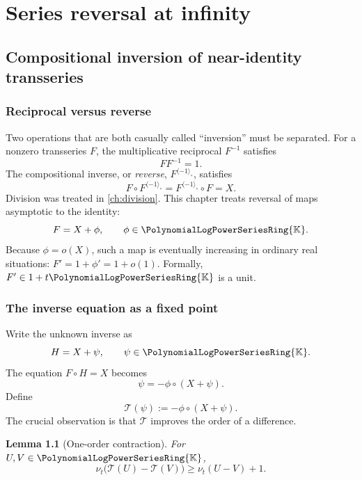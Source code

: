 \documentclass[11pt,oneside,openany]{book}
\newtheorem{lemma}[theorem]{Lemma}
\newcommand{\K}{\mathbb{K}}
\newcommand{\Rring}{\PolynomialLogPowerSeriesRing{\K}}
\newcommand{\ordt}{\nu_t}
\newcommand{\compose}{\mathbin{\circ}}
\newcommand{\rev}{^{\langle-1\rangle_{\circ}}}
\begin{document}
\part{Series reversal at infinity}

\chapter{Compositional inversion of near-identity transseries}
\label{ch:reversion}

\section{Reciprocal versus reverse}
Two operations that are both casually called ``inversion'' must be separated.
For a nonzero transseries \(F\), the multiplicative reciprocal \(F^{-1}\)
satisfies
\[
 FF^{-1}=1.
\]
The compositional inverse, or \emph{reverse}, \(F\rev\), satisfies
\begin{equation}\label{eq:reverseidentity}
 F\compose F\rev=F\rev\compose F=X.
\end{equation}
Division was treated in \cref{ch:division}.  This chapter treats reversal of
maps asymptotic to the identity:
\begin{equation}\label{eq:Fnearid}
 F=X+\phi,
 \qquad \phi\in\Rring.
\end{equation}
Because \(\phi=o(X)\), such a map is eventually increasing in ordinary real
situations: \(F'=1+\phi'=1+o(1)\).  Formally, \(F'\in1+t\Rring\) is a unit.

\section{The inverse equation as a fixed point}
Write the unknown inverse as
\[
 H=X+\psi,
 \qquad \psi\in\Rring.
\]
The equation \(F\compose H=X\) becomes
\begin{equation}\label{eq:inversefixedpoint}
 \psi=-\phi\compose(X+\psi).
\end{equation}
Define
\begin{equation}\label{eq:inversePhi}
 \mathcal{T}(\psi):=-\phi\compose(X+\psi).
\end{equation}
The crucial observation is that \(\mathcal{T}\) improves the order of a
difference.

\begin{lemma}[One-order contraction]\label{lem:inversecontraction}
For \(U,V\in\Rring\),
\begin{equation}\label{eq:inversecontraction}
 \ordt\bigl(\mathcal{T}(U)-\mathcal{T}(V)\bigr)
 \geq \ordt(U-V)+1.
\end{equation}
\end{lemma}
\end{document}
